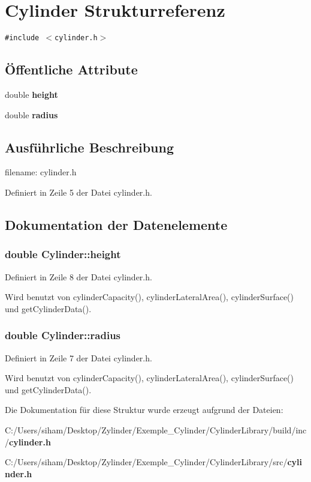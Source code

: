 \section{Cylinder Strukturreferenz}
\label{struct_cylinder}
{\tt \#include $<$cylinder.h$>$}

\subsection*{\"{O}ffentliche Attribute}
\begin{CompactItemize}
\item 
double {\bf height}
\item 
double {\bf radius}
\end{CompactItemize}


\subsection{Ausf\"{u}hrliche Beschreibung}
filename: cylinder.h 



Definiert in Zeile 5 der Datei cylinder.h.

\subsection{Dokumentation der Datenelemente}
\subsubsection{\setlength{\rightskip}{0pt plus 5cm}double {\bf Cylinder::height}}\label{struct_cylinder_b435e227d5dd201e1768b2bcb2e0aa81}




Definiert in Zeile 8 der Datei cylinder.h.

Wird benutzt von cylinder\-Capacity(), cylinder\-Lateral\-Area(), cylinder\-Surface() und get\-Cylinder\-Data().
\subsubsection{\setlength{\rightskip}{0pt plus 5cm}double {\bf Cylinder::radius}}\label{struct_cylinder_fc021d54683383e5078ab9fefc4d53c8}




Definiert in Zeile 7 der Datei cylinder.h.

Wird benutzt von cylinder\-Capacity(), cylinder\-Lateral\-Area(), cylinder\-Surface() und get\-Cylinder\-Data().

Die Dokumentation f\"{u}r diese Struktur wurde erzeugt aufgrund der Dateien:\begin{CompactItemize}
\item 
C:/Users/siham/Desktop/Zylinder/Exemple\_\-Cylinder/Cylinder\-Library/build/inc/{\bf cylinder.h}\item 
C:/Users/siham/Desktop/Zylinder/Exemple\_\-Cylinder/Cylinder\-Library/src/{\bf cylinder.h}\end{CompactItemize}
